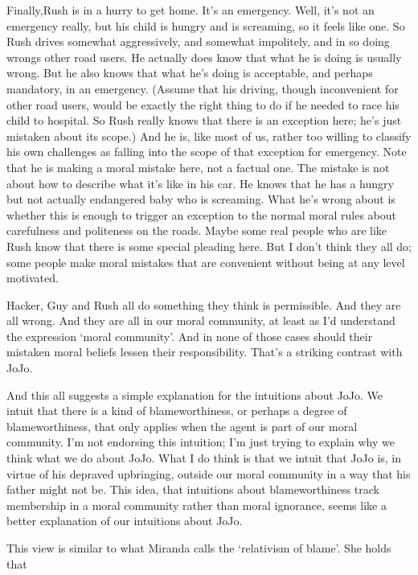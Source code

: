 Finally,\gls{Rush} is in a hurry to get home. It's an emergency. Well, it's not an emergency really, but his child is hungry and is screaming, so it feels like one. So \gls{Rush} drives somewhat aggressively, and somewhat impolitely, and in so doing wrongs other road users. He actually does know that what he is doing is usually wrong. But he also knows that what he's doing is acceptable, and perhaps mandatory, in an emergency. (Assume that his driving, though inconvenient for other road users, would be exactly the right thing to do if he needed to race his child to hospital. So Rush really knows that there is an exception here; he's just mistaken about its scope.) And he is, like most of us, rather too willing to classify his own challenges as falling into the scope of that exception for emergency. Note that he is making a moral mistake here, not a factual one. The mistake is not about how to describe what it's like in his car. He knows that he has a hungry but not actually endangered baby who is screaming. What he's wrong about is whether this is enough to trigger an exception to the normal moral rules about carefulness and politeness on the roads. Maybe some real people who are like \gls{Rush} know that there is some special pleading here. But I don't think they all do; some people make moral mistakes that are convenient without being at any level motivated.

\gls{Hacker}, \gls{Guy} and \gls{Rush} all do something they think is permissible. And they are all wrong. And they are all in our moral community, at least as I'd understand the expression `moral community'. And in none of those cases should their mistaken moral beliefs lessen their responsibility. That's a striking contrast with \gls{JoJo}.

And this all suggests a simple explanation for the intuitions about \gls{JoJo}. We intuit that there is a kind of blameworthiness, or perhaps a degree of blameworthiness, that only applies when the agent is part of our moral community. I'm not endorsing this intuition; I'm just trying to explain why we think what we do about \gls{JoJo}. What I do think is that we intuit that \gls{JoJo} is, in virtue of his depraved upbringing, outside our moral community in a way that his father might not be. This idea, that intuitions about blameworthiness track membership in a moral community rather than moral ignorance, seems like a better explanation of our intuitions about \gls{JoJo}.

This view is similar to what Miranda \citet[152]{Fricker2010} calls the `relativism of blame'. She holds that

